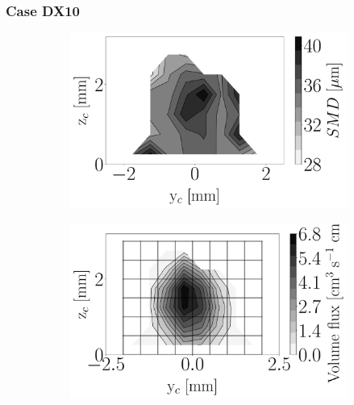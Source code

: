 \subsubsection*{Case DX10}





\begin{figure}[h!]
\centering
\begin{subfigure}[b]{0.3\textwidth}
	\centering
   \includegraphics[scale=\scaleSLIBIMER]{./part3_applications/figures_ch8_resolved/injectors_SLI/dx10_xD05p00_SMD_map}
\end{subfigure}
   \hspace{0.17in}
\begin{subfigure}[b]{0.3\textwidth}
	\centering
   \includegraphics[scale=\scaleSLIBIMER]{./part3_applications/figures_ch8_resolved/injectors_SLI/dx10_xD05p00_volume_flux_map}

\end{subfigure}
\end{figure}
